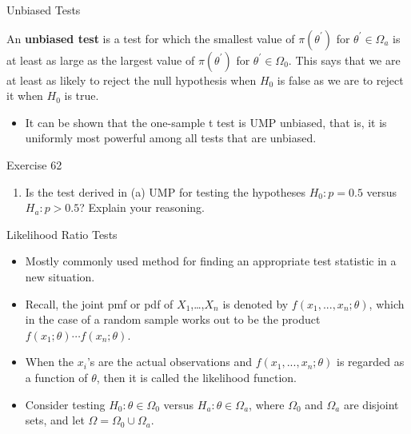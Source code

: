 \documentclass[
  ignorenonframetext,
]{beamer}
\providecommand{\tightlist}{%
  \setlength{\itemsep}{0pt}\setlength{\parskip}{0pt}}\usepackage{longtable,booktabs,array}
\begin{document}
\begin{frame}{Unbiased Tests}
\protect\hypertarget{unbiased-tests}{}
\begin{tcolorbox}[enhanced jigsaw, left=2mm, breakable, bottomrule=.15mm, colframe=quarto-callout-important-color-frame, arc=.35mm, leftrule=.75mm, colbacktitle=quarto-callout-important-color!10!white, titlerule=0mm, opacityback=0, coltitle=black, opacitybacktitle=0.6, colback=white, toprule=.15mm, toptitle=1mm, bottomtitle=1mm, title=\textcolor{quarto-callout-important-color}{\faExclamation}\hspace{0.5em}{Definition}, rightrule=.15mm]

An \textbf{unbiased test} is a test for which the smallest value of
\(\pi(\theta^{\prime})\) for \(\theta^{\prime} \in \Omega_{a}\) is at
least as large as the largest value of \(\pi(\theta^{\prime})\) for
\(\theta^{\prime} \in \Omega_{0}\). This says that we are at least as
likely to reject the null hypothesis when \(H_{0}\) is false as we are
to reject it when \(H_{0}\) is true.

\end{tcolorbox}

\begin{itemize}[<+->]
\tightlist
\item
  It can be shown that the one-sample t test is UMP unbiased, that is,
  it is uniformly most powerful among all tests that are unbiased.
\end{itemize}
\end{frame}

\begin{frame}{Exercise 62}
\protect\hypertarget{exercise-62}{}
\begin{enumerate}[<+->]
[a.]
\setcounter{enumi}{3}
\tightlist
\item
  Is the test derived in (a) UMP for testing the hypotheses
  \(H_{0}: p = 0.5\) versus \(H_{a}: p > 0.5\)? Explain your reasoning.
\end{enumerate}
\end{frame}

\begin{frame}{Likelihood Ratio Tests}
\protect\hypertarget{likelihood-ratio-tests}{}
\begin{itemize}[<+->]
\tightlist
\item
  Mostly commonly used method for finding an appropriate test statistic
  in a new situation.
\item
  Recall, the joint pmf or pdf of \(X_{1}\),\ldots,\(X_{n}\) is denoted
  by \(f(x_{1},...,x_{n};\theta)\), which in the case of a random sample
  works out to be the product \(f(x_{1};\theta)\cdots f(x_{n};\theta)\).
\item
  When the \(x_{i}\)'s are the actual observations and
  \(f(x_{1},...,x_{n};\theta)\) is regarded as a function of \(\theta\),
  then it is called the likelihood function.
\item
  Consider testing \(H_{0}:\theta \in \Omega_{0}\) versus
  \(H_{a}: \theta \in \Omega_{a}\), where \(\Omega_{0}\) and
  \(\Omega_{a}\) are disjoint sets, and let
  \(\Omega = \Omega_{0} \cup \Omega_{a}\).
\end{itemize}
\end{frame}
\end{document}
